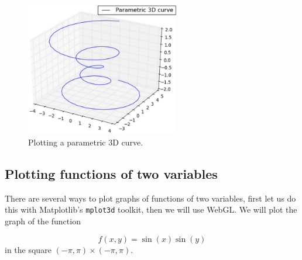 \documentclass[article,A4,12pt]{llncs}
\begin{document}
\begin{figure}[!ht]
\begin{center}
\includegraphics[width=0.6\textwidth]{img/plot3d-1.png}
\end{center}
\vspace{-4mm}
\caption{Plotting a parametric 3D curve.}
\label{fig:plot3d-1}
\end{figure}


\subsection[\ \ Plotting functions of two variables]{Plotting functions of two variables}

There are several ways to plot graphs of functions of two variables, 
first let us do this with Matplotlib's {\tt mplot3d} toolkit, then we will
use WebGL. We will plot the graph of the function 

$$
  f(x, y) = \sin(x) \sin(y)
$$
in the square $(-\pi, \pi) \times (-\pi, \pi)$.
\end{document}

